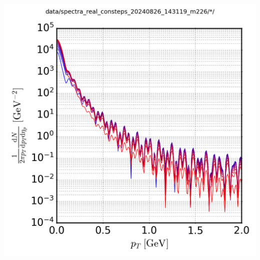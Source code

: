 {\begin{minipage}{\linewidth}
{\begin{minipage}{0.45\linewidth}
                \includegraphics[width=\linewidth]{code/C++/DCCspec/data/images/spectra_real_consteps_20240826_143119_m226_spec.png}        
            \end{minipage}
        }
    \end{minipage}
}

